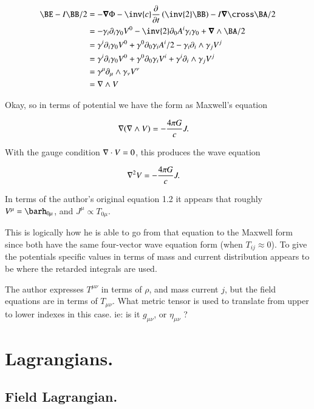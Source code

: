 \begin{align*}
\BE - I\BB/2 
&= - \spacegrad \Phi -\inv{c} \PD{t}{}\left( \inv{2} \BB \right) - I\spacegrad \cross \BA/2 \\
&= - \gamma_i \partial_i \gamma_0 V^0 - \inv{2} \partial_0 A^i \gamma_i \gamma_0 + \spacegrad \wedge \BA/2 \\
&= \gamma^i \partial_i \gamma_0 V^0 + \gamma^0 \partial_0 \gamma_i A^i/2 - \gamma_i \partial_i \wedge \gamma_j V^j \\
&= \gamma^i \partial_i \gamma_0 V^0 + \gamma^0 \partial_0 \gamma_i V^i + \gamma^i \partial_i \wedge \gamma_j V^j \\
&= \gamma^\mu \partial_\mu \wedge \gamma_\nu V^\nu \\
&= \grad \wedge V
\end{align*}

Okay, so in terms of potential we have the form as Maxwell's equation

\begin{align}\label{eqn:gem:field}
\nabla (\nabla \wedge V) &= -\frac{4\pi G}{c} J.
\end{align}

With the gauge condition $\nabla \cdot V = 0$, this produces the wave equation

\begin{align}
\nabla^2 V &= -\frac{4\pi G}{c} J.
\end{align}

In terms of the author's original equation 1.2 it appears that roughly 
$V^\mu = \barh_{0\mu}$, and $J^\mu \propto T_{0\mu}$.

This is logically how he is able to go from that equation to the Maxwell
form since both have the same four-vector wave equation form (when $T_{ij} \approx 0$).  To give the potentials specific values in terms of mass and current
distribution appears to be where the retarded integrals are used.

The author expresses $T^{\mu\nu}$ in terms of $\rho$, and mass current $j$, but
the field equations are in terms of $T_{\mu\nu}$.  What metric tensor is
used to translate from upper to lower indexes in this case.  ie: is it $g_{\mu\nu}$, or $\eta_{\mu\nu}$ ?

\section{Lagrangians. }

\subsection{Field Lagrangian. }

